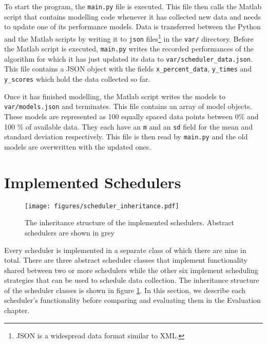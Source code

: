 \documentclass[a4paper,12pt,twoside,openright]{report}
\begin{document}
To start the program, the \texttt{main.py} file is executed. This file then calls the Matlab script that contains modelling code whenever it has collected new data and needs to update one of its performance models. Data is transferred between the Python and the Matlab scripts by writing it to \texttt{json} files\footnote{JSON is a widespread data format similar to XML.} in the \texttt{var/} directory.  Before the Matlab script is executed, \texttt{main.py} writes the recorded performances of the algorithm for which it has just updated its data to \texttt{var/scheduler\_data.json}. This file contains a JSON object with the fields \texttt{x\_percent\_data}, \texttt{y\_times} and \texttt{y\_scores} which hold the data collected so far.

Once it has finished modelling, the Matlab script writes the models to \texttt{var/models.json} and terminates. This file contains an array of model objects. These models are represented as 100 equally spaced data points between 0\% and 100 \% of available data. They each have an \texttt{m} and an \texttt{sd} field for the mean and standard deviation respectively. This file is then read by \texttt{main.py} and the old models are overwritten with the updated ones.



\section{Implemented Schedulers}

\begin{figure}
    \centerline{\texttt{[image: figures/scheduler\_inheritance.pdf]}}
  \caption{The inheritance structure of the implemented schedulers. Abstract schedulers are shown in grey}
    \label{schedulerinheritance}
\end{figure}

Every scheduler is implemented in a separate class of which there are nine in total. There are three abstract scheduler classes that implement functionality shared between two or more schedulers while the other six implement scheduling strategies that can be used to schedule data collection. The inheritance structure of the scheduler classes is shown in figure \ref{schedulerinheritance}. In this section, we describe each scheduler's functionality before comparing and evaluating them in the Evaluation chapter.

\end{document}
